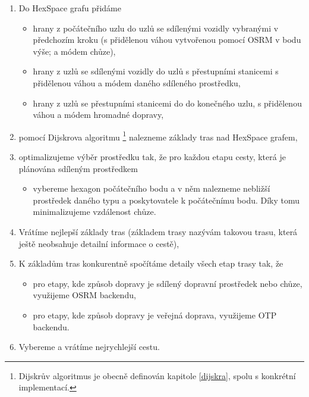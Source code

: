 \documentclass[thesis=M,czech]{FITthesis}[2019/12/23]
\theoremstyle{plain}
\theoremstyle{definition}
\begin{document}
\begin{enumerate}
\begin{itemize}
	\end{itemize}

	\item Do HexSpace grafu přidáme

	\begin{itemize}
		\item hrany z počátečního uzlu do uzlů se sdílenými vozidly vybranými v předchozím kroku (s přidělenou váhou vytvořenou pomocí OSRM v bodu výše; a módem chůze),
		\item hrany z uzlů se sdílenými vozidly do uzlů s přestupními stanicemi s přidělenou váhou a módem daného sdíleného prostředku,
		\item hrany z uzlů se přestupními stanicemi do do konečného uzlu, s přidělenou váhou a módem hromadné dopravy,
	\end{itemize}

	\item pomocí Dijskrova algoritmu \footnote{Dijskrův algoritmus je obecně definován kapitole \ref{dijskra}, spolu s konkrétní implementací.} nalezneme základy tras nad HexSpace grafem,

	\item optimalizujeme výběr prostředku tak, že pro každou etapu cesty, která je plánována sdíleným prostředkem
	\begin{itemize}
		\item vybereme hexagon počátečního bodu a v něm nalezneme nebližší prostředek daného typu a poskytovatele k počátečnímu bodu. Díky tomu minimalizujeme vzdálenost chůze.
	\end{itemize}
	\item Vrátíme nejlepší základy tras (základem trasy nazývám takovou trasu, která ještě neobsahuje detailní informace o cestě),
	\item K základům tras konkurentně spočítáme detaily všech etap trasy tak, že
	\begin{itemize}
		\item pro etapy, kde způsob dopravy je sdílený dopravní prostředek nebo chůze, využijeme OSRM backendu,
		\item pro etapy, kde způsob dopravy je veřejná doprava, využijeme OTP backendu.
	\end{itemize}
	\item Vybereme a vrátíme nejrychlejší cestu.

\end{enumerate}
\end{document}
